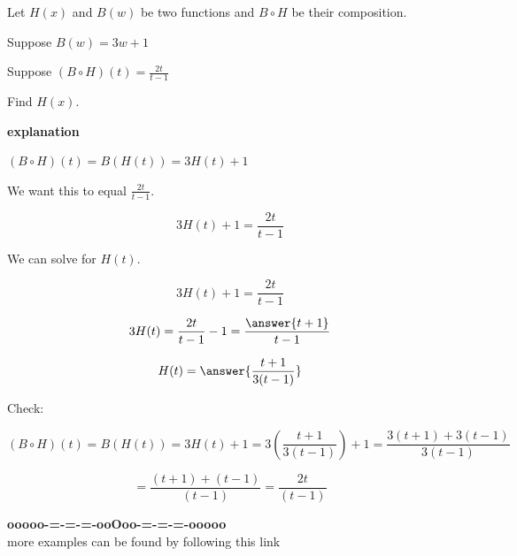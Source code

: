 \documentclass{ximera}
\begin{document}
\begin{example}


Let $H(x)$ and $B(w)$ be two functions and $B \circ H$ be their composition.


Suppose $B(w) = 3w + 1$ 

Suppose $(B \circ H)(t) = \frac{2t}{t-1}$


Find $H(x)$.



\textbf{\textcolor{red!75!green}{explanation}} 




$(B \circ H)(t) =  B(H(t)) = 3 H(t) + 1$ 


We want this to equal $\frac{2t}{t-1}$.




\[
3 H(t) + 1 = \frac{2t}{t-1}
\]


We can solve for $H(t)$.



\[
3 H(t) + 1 = \frac{2t}{t-1}
\]

\[
3 H(t) = \frac{2t}{t-1} - 1 = \frac{\answer{t+1}}{t-1}
\]

\[
H(t)  = \answer{\frac{t+1}{3(t-1)}}
\]



Check:

\[
(B \circ H)(t) =  B(H(t)) = 3 H(t) + 1 = 3 \left( \frac{t+1}{3(t-1)} \right) + 1 = \frac{3(t+1) + 3(t-1)}{3(t-1)} 
\]


\[
 = \frac{(t+1) + (t-1)}{(t-1)}  = \frac{2t}{(t-1)}
\]




\end{example}





















\begin{center}
\textbf{\textcolor{green!50!black}{ooooo-=-=-=-ooOoo-=-=-=-ooooo}} \\

more examples can be found by following this link\\ 

\end{center}
\end{document}
